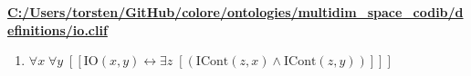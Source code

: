\documentclass{article}
\begin{document}
\textbf{\url{C:/Users/torsten/GitHub/colore/ontologies/multidim\_space\_codib/definitions/io.clif}}

\begin{enumerate}
\item $\forall x\; \forall y\;  \left[ \left[ \textrm{IO}(x,y) \leftrightarrow \exists z\;  \left[ \left(\textrm{ICont}(z,x) \land \textrm{ICont}(z,y)\right) \right] \right] \right]$
\end{enumerate}
\end{document}
